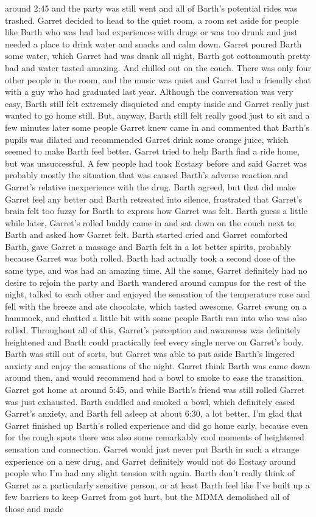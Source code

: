 \documentclass[12pt]{book}
\begin{document}
around 2:45 and the party was still went and all of Barth's potential rides was trashed. Garret decided to head to the quiet room, a room set aside for people like Barth who was had bad experiences with drugs or was too drunk and just needed a place to drink water and snacks and calm down. Garret poured Barth some water, which Garret had was drank all night, Barth got cottonmouth pretty bad and water tasted amazing. And chilled out on the couch. There was only four other people in the room, and the music was quiet and Garret had a friendly chat with a guy who had graduated last year. Although the conversation was very easy, Barth still felt extremely disquieted and empty inside and Garret really just wanted to go home still. But, anyway, Barth still felt really good just to sit and a few minutes later some people Garret knew came in and commented that Barth's pupils was dilated and recommended Garret drink some orange juice, which seemed to make Barth feel better. Garret tried to help Barth find a ride home, but was unsuccessful. A few people had took Ecstasy before and said Garret was probably mostly the situation that was caused Barth's adverse reaction and Garret's relative inexperience with the drug. Barth agreed, but that did make Garret feel any better and Barth retreated into silence, frustrated that Garret's brain felt too fuzzy for Barth to express how Garret was felt. Barth guess a little while later, Garret's rolled buddy came in and sat down on the couch next to Barth and asked how Garret felt. Barth started cried and Garret comforted Barth, gave Garret a massage and Barth felt in a lot better spirits, probably because Garret was both rolled. Barth had actually took a second dose of the same type, and was had an amazing time. All the same, Garret definitely had no desire to rejoin the party and Barth wandered around campus for the rest of the night, talked to each other and enjoyed the sensation of the temperature rose and fell with the breeze and ate chocolate, which tasted awesome. Garret swung on a hammock, and chatted a little bit with some people Barth ran into who was also rolled. Throughout all of this, Garret's perception and awareness was definitely heightened and Barth could practically feel every single nerve on Garret's body. Barth was still out of sorts, but Garret was able to put aside Barth's lingered anxiety and enjoy the sensations of the night. Garret think Barth was came down around then, and would recommend had a bowl to smoke to ease the transition. Garret got home at around 5:45, and while Barth's friend was still rolled Garret was just exhausted. Barth cuddled and smoked a bowl, which definitely eased Garret's anxiety, and Barth fell asleep at about 6:30, a lot better. I'm glad that Garret finished up Barth's rolled experience and did go home early, because even for the rough spots there was also some remarkably cool moments of heightened sensation and connection. Garret would just never put Barth in such a strange experience on a new drug, and Garret definitely would not do Ecstasy around people who I'm had any slight tension with again. Barth don't really think of Garret as a particularly sensitive person, or at least Barth feel like I've built up a few barriers to keep Garret from got hurt, but the MDMA demolished all of those and made 
\end{document}
